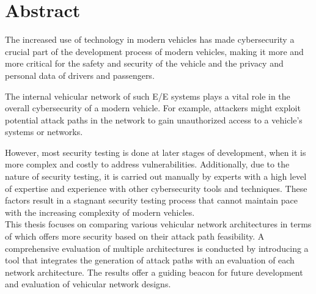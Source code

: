 
\chapter*{Abstract}\label{chp:abstract}

The increased use of technology in modern vehicles has made cybersecurity a crucial part of the development process of modern vehicles,
making it more and more critical for the safety and security of the vehicle and the privacy and personal data of drivers and passengers.

The internal vehicular network of such E/E systems plays a vital role in the overall cybersecurity of a modern vehicle.
For example, attackers might exploit potential attack paths in the network to gain unauthorized access to a vehicle's systems or networks.

However, most security testing is done at later stages of development, when it is more complex and costly to address vulnerabilities.
Additionally, due to the nature of security testing, it is carried out manually by experts with a high level of expertise and experience with other cybersecurity tools and techniques.
These factors result in a stagnant security testing process that cannot maintain pace with the increasing complexity of modern vehicles.
\\

This thesis focuses on comparing various vehicular network architectures in terms of which offers more security based on their attack path feasibility.
A comprehensive evaluation of multiple architectures is conducted by introducing a tool that integrates the generation of attack paths with an evaluation of each network architecture. 
The results offer a guiding beacon for future development and evaluation of vehicular network designs.